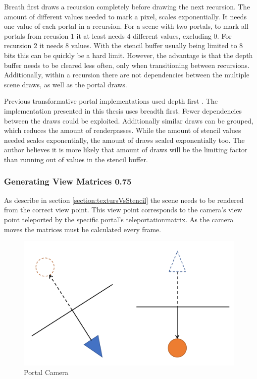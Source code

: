Breath first draws a recursion completely before drawing the next recursion. The amount of different values needed to mark a pixel, scales exponentially. It needs one value of each portal in a recursion. For a scene with two portals, to mark all portals from recusion 1 it at least needs 4 different values, excluding 0. For recursion 2 it needs 8 values. With the stencil buffer usually being limited to 8 bits this can be quickly be a hard limit. However, the advantage is that the depth buffer needs to be cleared less often, only when transitioning between recursions. Additionally, within a recursion there are not dependencies between the multiple scene draws, as well as the portal draws.

Previous transformative portal implementations used depth first \cite{lowe:2005:technique,lecture:portalProblems}. The implementation presented in this thesis uses breadth first. Fewer dependencies between the draws could be exploited. Additionally similar draws can be grouped, which reduces the amount of renderpasses. While the amount of stencil values needed scales exponentially, the amount of draws scaled exponentially too. The author believes it is more likely that amount of draws will be the limiting factor than running out of values in the stencil buffer.



\subsubsection{Generating View Matrices 0.75}
\label{section:generatingviewmatrices}
As describe in section \ref{section:textursVsStencil} the scene needs to be rendered from the correct view point. This view point corresponds to the camera's view point teleported by the specific portal's \gls{teleportationmatrix}. As the camera moves the matrices must be calculated every frame.

\begin{figure}[h]
	\includegraphics[width=\linewidth]{images/camera_matrices.png}
	\caption{Portal Camera}
	\label{fig:cameramatrices}
\end{figure}

